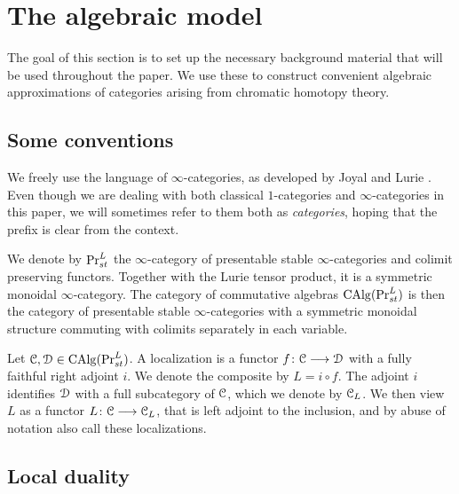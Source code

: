 
\section{The algebraic model}

The goal of this section is to set up the necessary background material that will be used throughout the paper. We use these to construct convenient algebraic approximations of categories arising from chromatic homotopy theory. 

\subsection*{Some conventions}

We freely use the language of $\infty$-categories, as developed by Joyal \cite{joyal_02} and Lurie \cite{lurie_09, Lurie_HA}. Even though we are dealing with both classical $1$-categories and $\infty$-categories in this paper, we will sometimes refer to them both as \emph{categories}, hoping that the prefix is clear from the context. 

We denote by $\mathrm{Pr}_{st}^L$ the $\infty$-category of presentable stable $\infty$-categories and colimit preserving functors. Together with the Lurie tensor product, it is a symmetric monoidal $\infty$-category. The category of commutative algebras $\operatorname{CAlg}(\mathrm{Pr}_{st}^L)$ is then the category of presentable stable $\infty$-categories with a symmetric monoidal structure commuting with colimits separately in each variable.

Let $\EuScript{C}, \EuScript{D}\in \operatorname{CAlg}(\mathrm{Pr}_{st}^L)$. A localization is a functor $f\colon \EuScript{C}\longrightarrow \EuScript{D}$ with a fully faithful right adjoint $i$. We denote the composite by $L= i\circ f$. The adjoint $i$ identifies $\EuScript{D}$ with a full subcategory of $\EuScript{C}$, which we denote by $\EuScript{C}_L$. We then view $L$ as a functor $L\colon \EuScript{C}\longrightarrow\EuScript{C}_L$, that is left adjoint to the inclusion, and by abuse of notation also call these localizations. 



















\subsection{Local duality}

